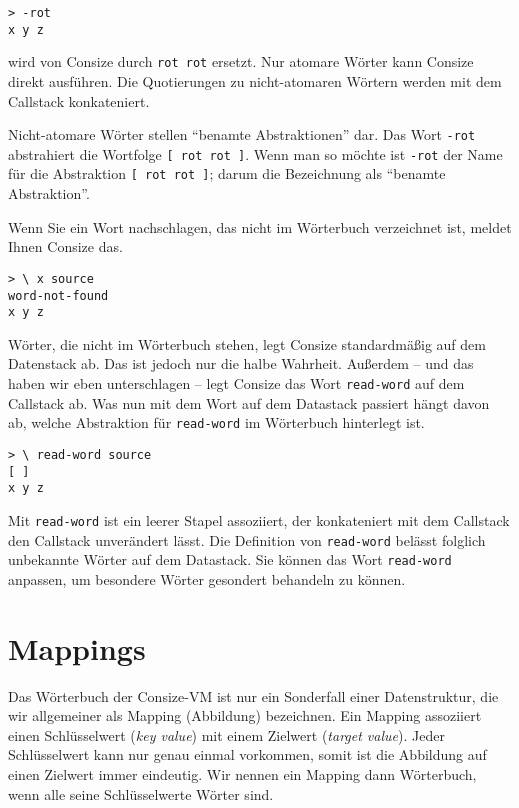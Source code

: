 \begin{verbatim}
> -rot
x y z
\end{verbatim}

wird von Consize durch \verb|rot rot| ersetzt. Nur atomare Wörter kann Consize direkt ausführen. Die Quotierungen zu nicht-atomaren Wörtern werden mit dem Callstack konkateniert.

Nicht-atomare Wörter stellen "`benamte Abstraktionen"' dar. Das Wort \verb|-rot| abstrahiert die Wortfolge \verb|[ rot rot ]|. Wenn man so möchte ist \verb|-rot| der Name für die Abstraktion \verb|[ rot rot ]|; darum die Bezeichnung als "`benamte Abstraktion"'.

Wenn Sie ein Wort nachschlagen, das nicht im Wörterbuch verzeichnet ist, meldet Ihnen Consize das.

\begin{verbatim}
> \ x source
word-not-found
x y z
\end{verbatim}

Wörter, die nicht im Wörterbuch stehen, legt Consize standardmäßig auf dem Datenstack ab. Das ist jedoch nur die halbe Wahrheit. Außerdem -- und das haben wir eben unterschlagen -- legt Consize das Wort \verb|read-word| auf dem Callstack ab. Was nun mit dem Wort auf dem Datastack passiert hängt davon ab, welche Abstraktion für \verb|read-word| im Wörterbuch hinterlegt ist.

\begin{verbatim}
> \ read-word source
[ ]
x y z
\end{verbatim}

Mit \verb|read-word| ist ein leerer Stapel assoziiert, der konkateniert mit dem Callstack den Callstack unverändert lässt. Die Definition von \verb|read-word| belässt folglich unbekannte Wörter auf dem Datastack. Sie können das Wort \verb|read-word| anpassen, um besondere Wörter gesondert behandeln zu können.

\section{Mappings}

Das Wörterbuch der Consize-VM ist nur ein Sonderfall einer Datenstruktur, die wir allgemeiner als Mapping (Abbildung) bezeichnen.
Ein Mapping assoziiert einen Schlüsselwert (\emph{key value}) mit einem Zielwert (\emph{target value}).
Jeder Schlüsselwert kann nur genau einmal vorkommen, somit ist die Abbildung auf einen Zielwert immer eindeutig.
Wir nennen ein Mapping dann Wörterbuch, wenn alle seine Schlüsselwerte Wörter sind.

